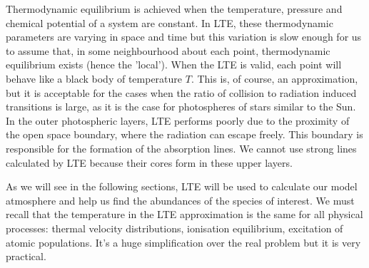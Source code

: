 \documentclass[dvips,12pt,a4paper]{report}
\begin{document}
{%

Thermodynamic equilibrium is achieved when the temperature, pressure and chemical potential of a system are constant. In LTE, these thermodynamic parameters are varying in space and time but this variation is slow enough for us to assume that, in some neighbourhood about each point, thermodynamic equilibrium exists (hence the 'local'). When the LTE is valid, each point will behave like a black body of temperature $T$. %
This is, of course, an approximation, but it is acceptable for the cases when the ratio of collision to radiation induced transitions is large, as it is the case for photospheres of stars similar to the Sun. In the outer photospheric layers, LTE performs poorly due to the proximity of the open space boundary, where the radiation can escape freely. This boundary is responsible for the formation of the absorption lines.
We cannot use strong lines calculated by LTE because their cores form in these upper layers.

As we will see in the following sections, LTE will be used to calculate our model atmosphere and help us find the abundances of the species of interest. We must recall that the temperature in the LTE approximation is the same for all physical processes: thermal velocity distributions, ionisation equilibrium, excitation of atomic populations. It's a huge simplification over the real problem but it is very practical.







}
\end{document}
